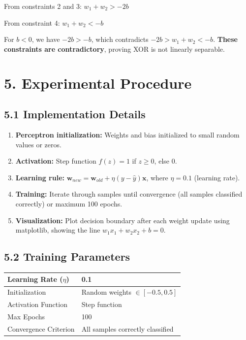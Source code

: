 \documentclass[11pt]{article}
\begin{document}
From constraints 2 and 3: $w_1 + w_2 > -2b$

From constraint 4: $w_1 + w_2 < -b$

For $b < 0$, we have $-2b > -b$, which contradicts $-2b > w_1 + w_2 < -b$. \textbf{These constraints are contradictory}, proving XOR is not linearly separable.

\section*{5. Experimental Procedure}

\subsection*{5.1 Implementation Details}
\begin{enumerate}[leftmargin=*]
\item \textbf{Perceptron initialization:} Weights and bias initialized to small random values or zeros.
\item \textbf{Activation:} Step function $f(z) = 1$ if $z \geq 0$, else $0$.
\item \textbf{Learning rule:} $\mathbf{w}_{new} = \mathbf{w}_{old} + \eta(y - \hat{y})\mathbf{x}$, where $\eta = 0.1$ (learning rate).
\item \textbf{Training:} Iterate through samples until convergence (all samples classified correctly) or maximum 100 epochs.
\item \textbf{Visualization:} Plot decision boundary after each weight update using matplotlib, showing the line $w_1 x_1 + w_2 x_2 + b = 0$.
\end{enumerate}

\subsection*{5.2 Training Parameters}
\begin{center}
\begin{tabular}{|l|l|}
\hline
Learning Rate ($\eta$) & 0.1\\ \hline
Initialization & Random weights $\in [-0.5, 0.5]$\\ \hline
Activation Function & Step function\\ \hline
Max Epochs & 100\\ \hline
Convergence Criterion & All samples correctly classified\\ \hline
\end{tabular}
\end{center}
\end{document}
